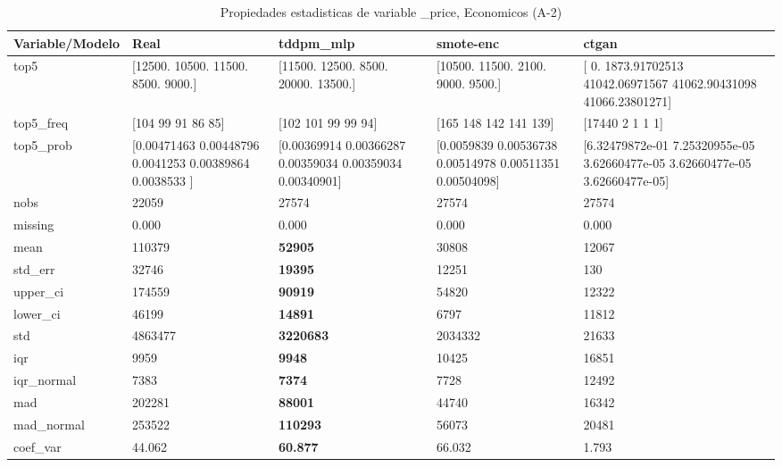 \begin{table}[H]
\centering
\fontsize{8}{14}\selectfont
\caption{Propiedades  estadisticas de variable \_price, Economicos (A-2)}
\label{table-stats-economicos-a-2-_price}
\begin{tabular}{|l|m{10em}|m{10em}|m{10em}|m{10em}|}
\hline
 \rowcolor[gray]{0.8}
Variable/Modelo & Real & tddpm\_mlp & smote-enc & ctgan \\
\hline top5 & [12500. 10500. 11500.  8500.  9000.] & [11500. 12500.  8500. 20000. 13500.] & [10500. 11500.  2100.  9000.  9500.] & [    0.          1873.91702513 41042.06971567 41062.90431098
 41066.23801271] \\
\hline top5\_freq & [104  99  91  86  85] & [102 101  99  99  94] & [165 148 142 141 139] & [17440     2     1     1     1] \\
\hline top5\_prob & [0.00471463 0.00448796 0.0041253  0.00389864 0.0038533 ] & [0.00369914 0.00366287 0.00359034 0.00359034 0.00340901] & [0.0059839  0.00536738 0.00514978 0.00511351 0.00504098] & [6.32479872e-01 7.25320955e-05 3.62660477e-05 3.62660477e-05
 3.62660477e-05] \\
\hline nobs & 22059 & 27574 & 27574 & 27574 \\
\hline missing & 0.000 & 0.000 & 0.000 & 0.000 \\
\hline mean & 110379 & \bfseries 52905 & 30808 & \cellcolor[rgb]{0.9, 0.54, 0.52} 12067 \\
\hline std\_err & 32746 & \bfseries 19395 & 12251 & \cellcolor[rgb]{0.9, 0.54, 0.52} 130 \\
\hline upper\_ci & 174559 & \bfseries 90919 & 54820 & \cellcolor[rgb]{0.9, 0.54, 0.52} 12322 \\
\hline lower\_ci & 46199 & \bfseries 14891 & \cellcolor[rgb]{0.9, 0.54, 0.52} 6797 & 11812 \\
\hline std & 4863477 & \bfseries 3220683 & 2034332 & \cellcolor[rgb]{0.9, 0.54, 0.52} 21633 \\
\hline iqr & 9959 & \bfseries 9948 & 10425 & \cellcolor[rgb]{0.9, 0.54, 0.52} 16851 \\
\hline iqr\_normal & 7383 & \bfseries 7374 & 7728 & \cellcolor[rgb]{0.9, 0.54, 0.52} 12492 \\
\hline mad & 202281 & \bfseries 88001 & 44740 & \cellcolor[rgb]{0.9, 0.54, 0.52} 16342 \\
\hline mad\_normal & 253522 & \bfseries 110293 & 56073 & \cellcolor[rgb]{0.9, 0.54, 0.52} 20481 \\
\hline coef\_var & 44.062 & \bfseries 60.877 & 66.032 & \cellcolor[rgb]{0.9, 0.54, 0.52} 1.793 \\

\end{tabular}
\end{table}
